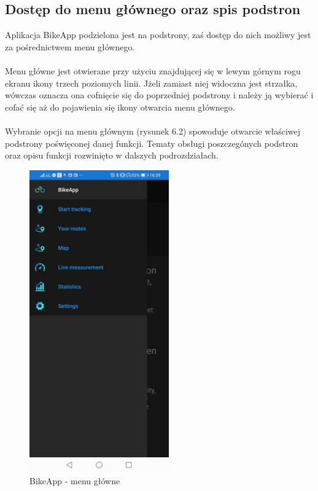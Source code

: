 \subsection{Dostęp do menu głównego oraz spis podstron} %
Aplikacja BikeApp podzielona jest na podstrony, zaś dostęp do nich możliwy jest za pośrednictwem menu głównego.\\
\\
Menu główne jest otwierane przy użyciu znajdującej się w lewym górnym rogu ekranu ikony trzech poziomych linii. Jżeli zamiast niej widoczna jest strzałka, wówczas oznacza ona cofnięcie się do poprzedniej podstrony i należy ją wybierać i cofać się aż do pojawienia się ikony otwarcia menu głównego.\\
\\
Wybranie opcji na menu głównym (rysunek 6.2) spowoduje otwarcie właściwej podstrony poświęconej danej funkcji. Tematy obsługi poszczegónych podstron oraz opisu funkcji rozwinięto w dalszych podrozdziałach.

\begin{figure}[!htb]
	\begin{center}
		\includegraphics[width=6cm]{rys/instructions-menu.jpg}
		\caption{BikeApp - menu główne}
		\label{rys:BikeApp - menu główna}
	\end{center}
\end{figure}

